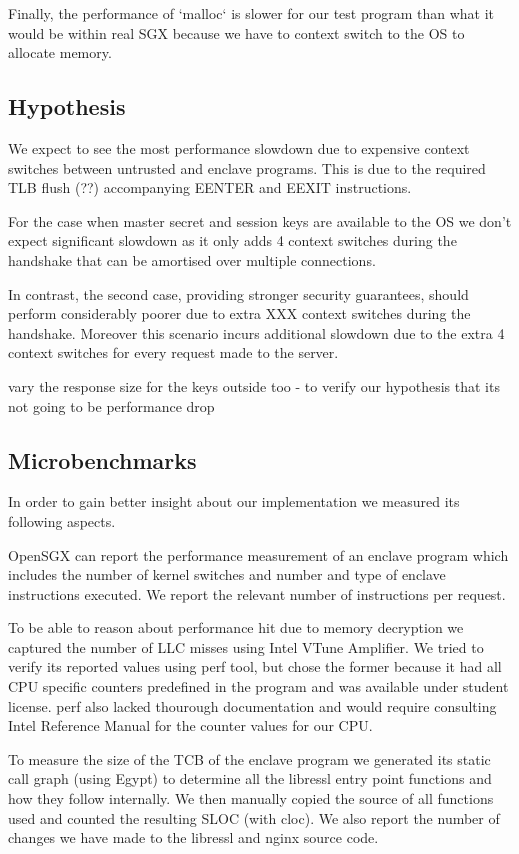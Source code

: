 \documentclass[../main.tex]{subfiles}
\begin{document}
Finally, the performance of `malloc` is slower for our test program than what
it would be within real SGX because we have to context switch to the OS to
allocate memory.

\subsection{Hypothesis}
We expect to see the most performance slowdown due to expensive context
switches between untrusted and enclave programs. This is due to the required
TLB flush (??) accompanying EENTER and EEXIT instructions.

For the case when master secret and session keys are available to the OS we
don't expect significant slowdown as it only adds 4 context switches during
the handshake that can be amortised over multiple connections.

In contrast, the second case, providing stronger security guarantees, should
perform considerably poorer due to extra XXX context switches during the
handshake. Moreover this scenario incurs additional slowdown due to the extra
4 context switches for every request made to the server.

vary the response size for the keys outside too - to verify our hypothesis
that its not going to be performance drop

\subsection{Microbenchmarks}
In order to gain better insight about our implementation we measured its
following aspects.

OpenSGX can report the performance measurement of an enclave program which
includes the number of kernel switches and number and type of enclave
instructions executed. We report the relevant number of instructions per
request.

To be able to reason about performance hit due to memory decryption we
captured the number of LLC misses using Intel VTune Amplifier. We tried to
verify its reported values using perf tool, but chose the former because it
had all CPU specific counters predefined in the program and was available
under student license. perf also lacked thourough documentation and would
require consulting Intel Reference Manual for the counter values for our CPU.
 
To measure the size of the TCB of the enclave program we generated its static
call graph (using Egypt) to determine all the libressl entry point functions
and how they follow internally. We then manually copied the source of all
functions used and counted the resulting SLOC (with cloc). We also report the
number of changes we have made to the libressl and nginx source code.
\end{document}
